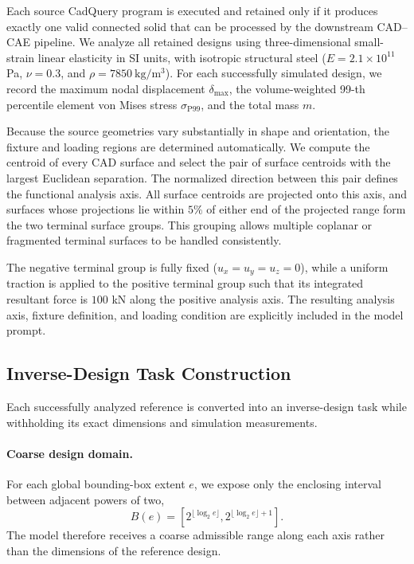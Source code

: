 Each source CadQuery program is executed and retained only if it produces
exactly one valid connected solid that can be processed by the downstream
CAD--CAE pipeline. We analyze all retained designs using three-dimensional
small-strain linear elasticity in SI units, with isotropic structural steel
($E=2.1\times10^{11}$ Pa, $\nu=0.3$, and
$\rho=7850~\mathrm{kg/m^3}$). For each successfully simulated design, we
record the maximum nodal displacement $\delta_{\max}$, the volume-weighted
99-th percentile element von Mises stress $\sigma_{\mathrm{P99}}$, and the
total mass $m$.

Because the source geometries vary substantially in shape and orientation,
the fixture and loading regions are determined automatically. We compute the
centroid of every CAD surface and select the pair of surface centroids with
the largest Euclidean separation. The normalized direction between this pair
defines the functional analysis axis. All surface centroids are projected
onto this axis, and surfaces whose projections lie within $5\%$ of either end
of the projected range form the two terminal surface groups. This grouping
allows multiple coplanar or fragmented terminal surfaces to be handled
consistently.

The negative terminal group is fully fixed
($u_x=u_y=u_z=0$), while a uniform traction is applied to the positive
terminal group such that its integrated resultant force is $100$ kN along
the positive analysis axis. The resulting analysis axis, fixture definition,
and loading condition are explicitly included in the model prompt.

\subsection{Inverse-Design Task Construction}
\label{app:inverse_task}

Each successfully analyzed reference is converted into an inverse-design task
while withholding its exact dimensions and simulation measurements.

\paragraph{Coarse design domain.}
For each global bounding-box extent $e$, we expose only the enclosing interval
between adjacent powers of two,
\begin{equation}
    B(e)
    =
    \left[
    2^{\lfloor \log_2 e \rfloor},
    2^{\lfloor \log_2 e \rfloor+1}
    \right].
    \label{eq:bbox_domain}
\end{equation}
The model therefore receives a coarse admissible range along each axis rather
than the dimensions of the reference design.

